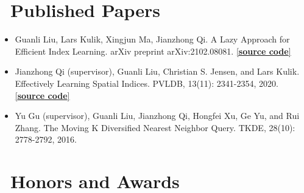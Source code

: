 \documentclass{resume}
\begin{document}
\section{\faFilesO\ Published Papers}
\begin{itemize}
 \item Guanli Liu, Lars Kulik, Xingjun Ma, Jianzhong Qi. A Lazy Approach for Efficient Index Learning. arXiv preprint arXiv:2102.08081. \href{https://github.com/Liuguanli/ModelReuse}{[\textbf{source code}]} 
 
  \item Jianzhong Qi (supervisor), Guanli Liu, Christian S. Jensen, and Lars Kulik. Effectively Learning Spatial Indices. PVLDB, 13(11): 2341-2354, 2020.  \href{https://github.com/Liuguanli/RSMI}{[\textbf{source code}]}

  \item Yu Gu (supervisor), Guanli Liu, Jianzhong Qi, Hongfei Xu, Ge Yu, and Rui Zhang. The Moving K Diversified Nearest Neighbor Query. TKDE, 28(10): 2778-2792, 2016.
\end{itemize}




\section{\faHeartO\ Honors and Awards}



%
%
\end{document}

